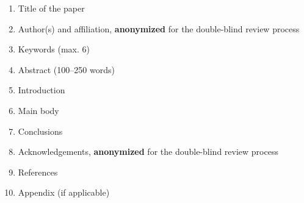 \documentclass{isprs} %
\begin{document}
{
	\begin{spacing}{1.17}
		\normalsize
	\end{spacing}
}


































































































\newpage

\begin{enumerate}
\setlength\itemsep{0em}\setlength\parskip{0em}\setlength\topsep{0em}\setlength\partopsep{0em}\setlength\parsep{0em} 
\item{Title of the paper} 
\item{Author(s) and affiliation, \textbf{anonymized} for the double-blind review process}
\item{Keywords (max. 6)}
\item{Abstract (100--250 words)}
\item{Introduction}
\item{Main body}
\item{Conclusions}
\item{Acknowledgements,  \textbf{anonymized} for the double-blind review process}
\item{References}
\item{Appendix (if applicable)}
\end{enumerate}
\end{document}
